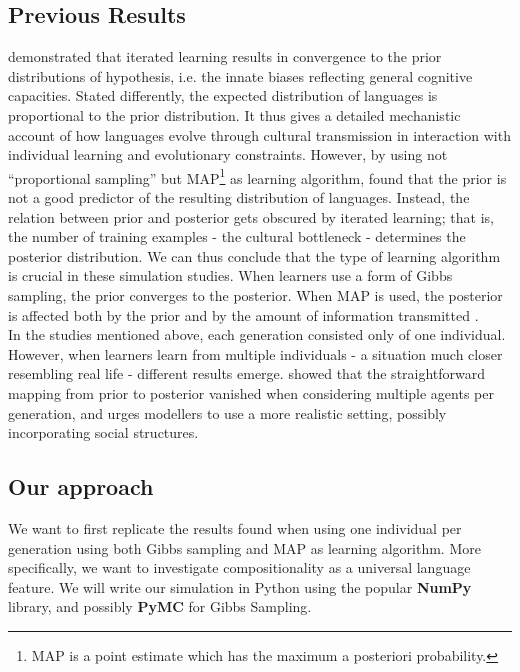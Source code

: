\documentclass[12pt]{scrartcl}
\begin{document}
\subsection*{Previous Results}
\textcite{griffiths2005bayesian} demonstrated that iterated learning results in convergence to the prior distributions of hypothesis, i.e. the innate biases reflecting general cognitive capacities. Stated differently, the expected distribution of languages is proportional to the prior distribution. It thus gives a detailed mechanistic account of how languages evolve through cultural transmission in interaction with individual learning and evolutionary constraints. However, by using not ``proportional sampling'' but MAP\footnote{MAP is a point estimate which has the maximum a posteriori probability.} as learning algorithm, \textcite{kirby2007innateness} found that the prior is not a good predictor of the resulting distribution of languages. Instead, the relation between prior and posterior gets obscured by iterated learning; that is, the number of training examples - the cultural bottleneck - determines the posterior distribution. We can thus conclude that the type of learning algorithm is crucial in these simulation studies. When learners use a form of Gibbs sampling, the prior converges to the posterior. When MAP is used, the posterior is affected both by the prior and by the amount of information transmitted \parencite{griffiths2007language}.\\

In the studies mentioned above, each generation consisted only of one individual. However, when learners learn from multiple individuals - a situation much closer resembling real life - different results emerge. \textcite{smith2009iterated} showed that the straightforward mapping from prior to posterior vanished when considering multiple agents per generation, and urges modellers to use a more realistic setting, possibly incorporating social structures.

\subsection*{Our approach}
We want to first replicate the results found when using one individual per generation using both Gibbs sampling and MAP as learning algorithm. More specifically, we want to investigate compositionality as a universal language feature. We will write our simulation in Python using the popular \textbf{NumPy} library, and possibly \textbf{PyMC} for Gibbs Sampling.



\newpage
\printbibliography
\end{document}

